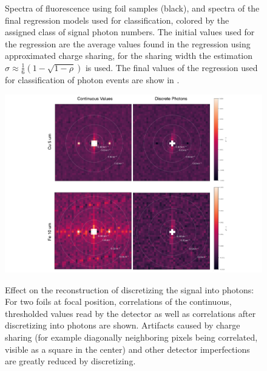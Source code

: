 \begin{figure}[h!]
\begin{subfigure}[b]{0.30\textwidth}
	\end{subfigure}
	\caption[Spectra of fluorescence using foil samples with photon number classes]{Spectra of fluorescence using foil samples (black), and spectra of the final regression models used for classification, colored by the assigned class of signal photon numbers. The initial values used for the regression are the average values found in the regression using approximated charge sharing, for the sharing width the estimation $\sigma\approx\frac{1}{6} \left(1-\sqrt{1-\rho }\right)$ is used.  The final values of the regression used for classification of photon events are show in .}
	\label{fig:thresholdsfoil}
\end{figure}
\begin{figure}
	\includegraphics[width=\linewidth]{images/foil_photonmodes.pdf}
	\label{fig:foil_photonmodes}
	\caption[Effect of discretizing the signal into photons]{Effect on the reconstruction of discretizing the signal into photons: For two foils at focal position,  correlations of the continuous, thresholded values read by the detector as well as  correlations after discretizing into photons are shown. Artifacts caused by charge sharing (for example diagonally neighboring pixels being correlated, visible as a square in the center) and other detector imperfections are greatly reduced by discretizing.}
\end{figure}



